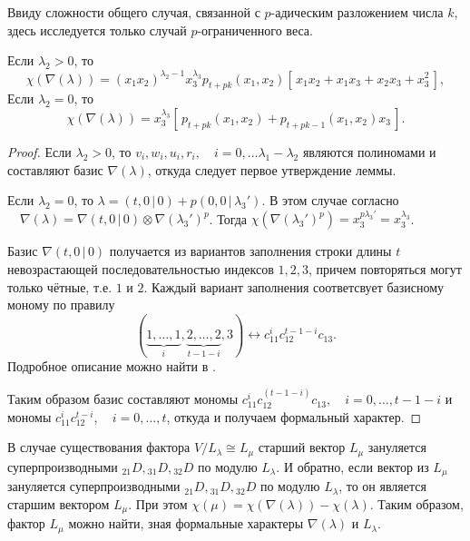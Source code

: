 Ввиду сложности общего случая, связанной с $p$-адическим разложением числа $k$, 
здесь исследуется только случай $p$-ограниченного веса.

\begin{lemma}
Если $ \lambda_2 > 0 $, то
$$ \chi (\nabla(\lambda)) = (x_1 x_2)^{\lambda_2 - 1} x_3^{\lambda_3} p_{t + pk} (x_1, x_2) [\,x_1 x_2 + x_1 x_3 + x_2 x_3 + x_3^2\,], $$
Если $ \lambda_2 = 0 $, то
$$ \chi (\nabla(\lambda)) = x_3^{\lambda_3} [\,p_{t + pk} (x_1, x_2) + p_{t + pk - 1} (x_1, x_2) x_3 \,]. $$
\end{lemma}
\begin{proof}
Если $ \lambda_2 > 0 $, то $ v_i, w_i, u_i, r_i, \quad i = 0, \ldots \lambda_1 - \lambda_2 $ являются полиномами и составляют базис $ \nabla(\lambda) $, 
откуда следует первое утверждение леммы.

Если $ \lambda_2 = 0 $, то $ \lambda = (t, 0 \,|\, 0) + p (0, 0 \,|\, \lambda_3 ') $. 
В этом случае согласно \cite{la_scala} $ \quad \nabla(\lambda) = \nabla(t, 0 \,|\, 0) \otimes \nabla(\lambda_3 ')^p $.
Тогда $ \chi (\nabla(\lambda_3 ')^p) = x_3^{p\lambda_3 '} = x_3^{\lambda_3} $.

Базис $ \nabla(t, 0 \,|\, 0) $ получается из вариантов заполнения строки длины $t$ 
невозрастающей последовательностью индексов $ 1, 2, 3 $, причем повторяться могут только чётные, т.е. $1$ и $2$.
Каждый вариант заполнения соответсвует базисному моному по правилу 
$$ (\underbrace{1, \ldots, 1}_i, \underbrace{2, \ldots, 2}_{t - 1 - i}, 3) \longleftrightarrow c_{11}^i c_{12}^{t - 1 - i} c_{13}. $$
Подробное описание можно найти в \cite{la_scala}. 

Таким образом базис составляют мономы $ c_{11}^i c_{12}^(t - 1 - i) c_{13}, \quad i = 0, \ldots, t - 1 - i $ 
и мономы $ c_{11}^i c_{12}^{t - i}, \quad i = 0, \ldots, t $, откуда и получаем формальный характер.
\end{proof}

В случае существования фактора $ V/L_{\lambda} \cong L_{\mu} $ старший вектор $ L_{\mu} $ 
зануляется суперпроизводными $ {_{21}D}, {_{31}D}, {_{32}D} $ по модулю $ L_{\lambda} $. 
И обратно, если вектор из $ L_{\mu} $ зануляется суперпроизводными $ {_{21}D}, {_{31}D}, {_{32}D} $ по модулю $ L_{\lambda} $, 
то он является старшим вектором $ L_{\mu} $. При этом $ \chi (\mu) = \chi (\nabla(\lambda)) - \chi (\lambda) $. 
Таким образом, фактор $ L_{\mu} $ можно найти, зная формальные характеры $ \nabla(\lambda) $ и $ L_{\lambda} $. 

